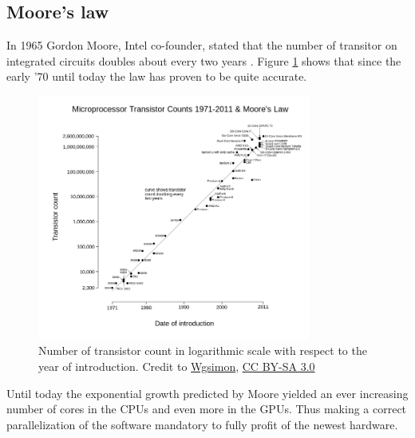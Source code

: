 \subsection{Moore's law}
In 1965 Gordon Moore, Intel co-founder, stated that the number of transitor on integrated circuits doubles about every two years \cite{moore}. Figure \ref{moore} shows that since the early '70 until today the law has proven to be quite accurate.

\begin{figure}
\includegraphics[width=0.8\textwidth]{architectures/moores.png}
\caption{Number of transistor count in logarithmic scale with respect to the year of introduction. Credit to \href{https://commons.wikimedia.org/wiki/User:Wgsimon}{Wgsimon}, \href{http://creativecommons.org/licenses/by-sa/3.0/}{CC BY-SA 3.0}}
\label{moore}
\end{figure}
\clearpage

Until today the exponential growth predicted by Moore yielded an ever increasing number of cores in the CPUs and even more in the GPUs. Thus making a correct parallelization of the software mandatory to fully profit of the newest hardware.

